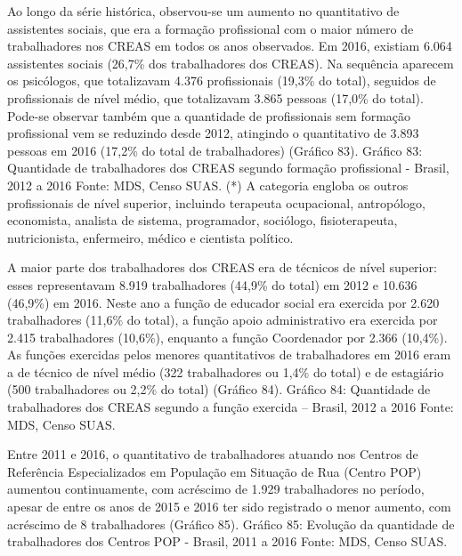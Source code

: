 \documentclass[
  brazilian]{report}
\begin{document}
Ao longo da série histórica, observou-se um aumento no quantitativo de
assistentes sociais, que era a formação profissional com o maior número
de trabalhadores nos CREAS em todos os anos observados. Em 2016,
existiam 6.064 assistentes sociais (26,7\% dos trabalhadores dos CREAS).
Na sequência aparecem os psicólogos, que totalizavam 4.376 profissionais
(19,3\% do total), seguidos de profissionais de nível médio, que
totalizavam 3.865 pessoas (17,0\% do total). Pode-se observar também que
a quantidade de profissionais sem formação profissional vem se reduzindo
desde 2012, atingindo o quantitativo de 3.893 pessoas em 2016 (17,2\% do
total de trabalhadores) (Gráfico 83). Gráfico 83: Quantidade de
trabalhadores dos CREAS segundo formação profissional - Brasil, 2012 a
2016 Fonte: MDS, Censo SUAS. (*) A categoria engloba os outros
profissionais de nível superior, incluindo terapeuta ocupacional,
antropólogo, economista, analista de sistema, programador, sociólogo,
fisioterapeuta, nutricionista, enfermeiro, médico e cientista político.

A maior parte dos trabalhadores dos CREAS era de técnicos de nível
superior: esses representavam 8.919 trabalhadores (44,9\% do total) em
2012 e 10.636 (46,9\%) em 2016. Neste ano a função de educador social
era exercida por 2.620 trabalhadores (11,6\% do total), a função apoio
administrativo era exercida por 2.415 trabalhadores (10,6\%), enquanto a
função Coordenador por 2.366 (10,4\%). As funções exercidas pelos
menores quantitativos de trabalhadores em 2016 eram a de técnico de
nível médio (322 trabalhadores ou 1,4\% do total) e de estagiário (500
trabalhadores ou 2,2\% do total) (Gráfico 84). Gráfico 84: Quantidade de
trabalhadores dos CREAS segundo a função exercida -- Brasil, 2012 a 2016
Fonte: MDS, Censo SUAS.

Entre 2011 e 2016, o quantitativo de trabalhadores atuando nos Centros
de Referência Especializados em População em Situação de Rua (Centro
POP) aumentou continuamente, com acréscimo de 1.929 trabalhadores no
período, apesar de entre os anos de 2015 e 2016 ter sido registrado o
menor aumento, com acréscimo de 8 trabalhadores (Gráfico 85). Gráfico
85: Evolução da quantidade de trabalhadores dos Centros POP - Brasil,
2011 a 2016 Fonte: MDS, Censo SUAS.
\end{document}
